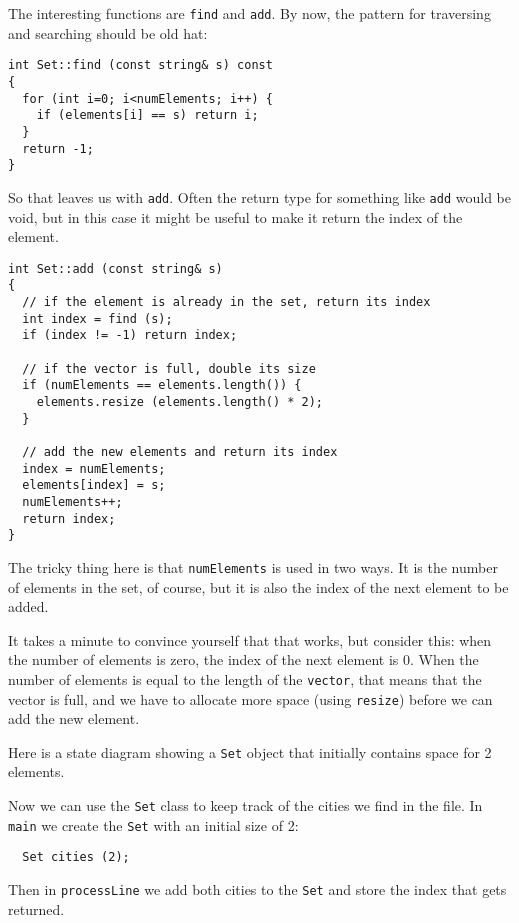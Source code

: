 
The interesting functions are {\tt find} and {\tt add}.  By
now, the pattern for traversing and searching should be old
hat:

\begin{verbatim}
int Set::find (const string& s) const
{
  for (int i=0; i<numElements; i++) {
    if (elements[i] == s) return i;
  }
  return -1;
}
\end{verbatim}
%
So that leaves us with {\tt add}.  Often the return type for
something like {\tt add} would be void, but in this case it
might be useful to make it return the index of the element.

\begin{verbatim}
int Set::add (const string& s)
{
  // if the element is already in the set, return its index
  int index = find (s);
  if (index != -1) return index;

  // if the vector is full, double its size
  if (numElements == elements.length()) {
    elements.resize (elements.length() * 2);
  }

  // add the new elements and return its index
  index = numElements;
  elements[index] = s;
  numElements++;
  return index;
}
\end{verbatim}
%
The tricky thing here is that {\tt numElements} is used in
two ways.  It is the number of elements in the set, of course,
but it is also the index of the next element to be added.

It takes a minute to convince yourself that that works, but
consider this: when the number of elements is zero, the index
of the next element is 0.  When the number of elements is
equal to the length of the {\tt vector}, that means that the
vector is full, and we have to allocate more space (using
{\tt resize}) before we can add the new element.


Here is a state diagram showing a {\tt Set} object that
initially contains space for 2 elements.

\vspace {0.1in}
\centerline{}
\vspace {0.1in}

Now we can use the {\tt Set} class to keep track of the cities
we find in the file.  In {\tt main} we create the {\tt Set} with
an initial size of 2:

\begin{verbatim}
  Set cities (2);
\end{verbatim}
%
Then in {\tt processLine} we add both cities to the {\tt Set}
and store the index that gets returned.

